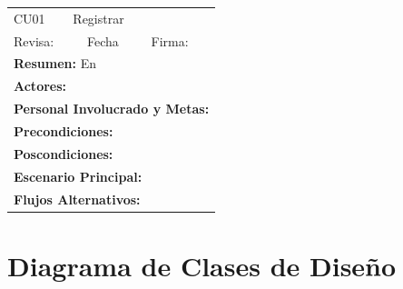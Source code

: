 \begin{longtable}{|l|p{5.5cm}|l|p{2cm}|l|p{1.9cm}|} \hline
    \cellcolor{grisOscuro} CU01 & \multicolumn{4}{|l|}{  \cellcolor{grisOscuro} Registrar} &  \cellcolor{grisClaro}\multirow{2}{1cm}{} \\ \cline{1-5}
    \cellcolor{grisOscuro} Revisa: &  \cellcolor{grisClaro} &  \cellcolor{grisOscuro} Fecha &  \cellcolor{grisClaro} &  \cellcolor{grisOscuro} Firma: & \cellcolor{grisClaro} \\ \hline
    \multicolumn{6}{|p{15cm}|}{ \textbf{Resumen: } En

    } \\ \hline

    \multicolumn{6}{|p{15cm}|}{ \textbf{Actores: }

    } \\ \hline

    \multicolumn{6}{|p{15cm}|}{ \textbf{Personal Involucrado y Metas: }

    } \\ \hline

    \multicolumn{6}{|p{15cm}|}{ \textbf{Precondiciones: }

    } \\ \hline

    \multicolumn{6}{|p{15cm}|}{ \textbf{Poscondiciones: }

    } \\ \hline

    \multicolumn{6}{|p{15cm}|}{ \textbf{Escenario Principal: }

    } \\ \hline

    \multicolumn{6}{|p{15cm}|}{ \textbf{Flujos Alternativos: }

    } \\ \hline

\end{longtable}



\section{Diagrama de Clases de Diseño}

